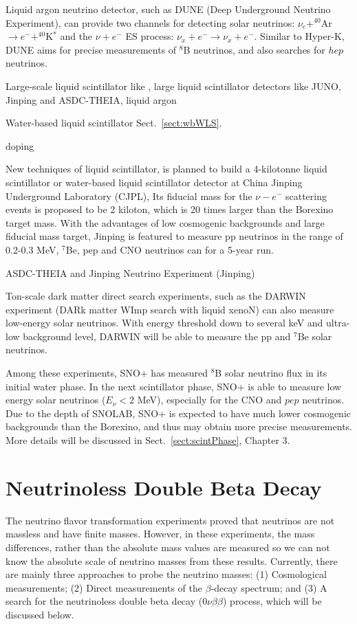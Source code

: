 Liquid argon neutrino detector, such as DUNE (Deep Underground Neutrino Experiment), can provide two channels for detecting solar neutrinos: $\nu_e+^{40}$Ar$\to e^-+^{40}$K$^*$ and the $\nu+e^-$ ES process: $\nu_x+e^-\to\nu_x+e^-$. Similar to Hyper-K, DUNE aims for precise measurements of $^8$B neutrinos, and also searches for $hep$ neutrinos\cite{capozzi2019dune}.

Large-scale liquid scintillator  
like , large liquid scintillator detectors like JUNO, Jinping and ASDC-THEIA, 
liquid argon 

Water-based liquid scintillator 
Sect.~\ref{sect:wbWLS}.

doping

New techniques of liquid scintillator, 
 is planned to build a 4-kilotonne liquid scintillator or water-based liquid scintillator detector at China Jinping Underground Laboratory (CJPL), 
 Its fiducial mass for the $\nu-e^-$ scattering events is proposed to be 2 kiloton, which is 20 times larger than the Borexino target mass. With the advantages of low cosmogenic backgrounds and large fiducial mass target, Jinping is featured to measure pp neutrinos in the range of 0.2-0.3 MeV, $^7$Be, pep and CNO neutrinos
 can for a 5-year run\cite{beacom2017physics}. 

ASDC-THEIA and Jinping Neutrino Experiment (Jinping)\cite{beacom2017physics}


Ton-scale dark matter direct search experiments, such as the DARWIN experiment (DARk matter WImp search with liquid xenoN) can also measure low-energy solar neutrinos. With energy threshold down to several keV and ultra-low background level, DARWIN will be able to measure the pp and $^7$Be solar neutrinos\cite{baudis2014neutrino,aalbers2016darwin,aalbers2020solar}.

Among these experiments, SNO+ has measured $^8$B solar neutrino flux in its initial water phase\cite{anderson2019measurement}. In the next scintillator phase, SNO+ is able to measure low energy solar neutrinos ($E_\nu<2$ MeV), especially for the CNO and $pep$ neutrinos. Due to the depth of SNOLAB, SNO+ is expected to have much lower cosmogenic backgrounds than the Borexino, and thus may obtain more precise measurements\cite{directorReview}. More details will be discussed in Sect.~\ref{sect:scintPhase}, Chapter 3.

\section{Neutrinoless Double Beta Decay}\label{sect:doublebeta}
The neutrino flavor transformation experiments proved that neutrinos are not massless and have finite masses. However, in these experiments, the mass differences, rather than the absolute mass values are measured so we can not know the absolute scale of neutrino masses from these results. Currently, there are mainly three approaches to probe the neutrino masses\cite{valle2015neutrinos}: (1) Cosmological measurements\cite{aghanim2020planck,dvorkin2019neutrino,lesgourgues2013neutrino}; (2) Direct measurements of the $\beta$-decay spectrum; and (3) A search for the neutrinoless double beta decay ($0\nu\beta\beta$) process, which will be discussed below.

